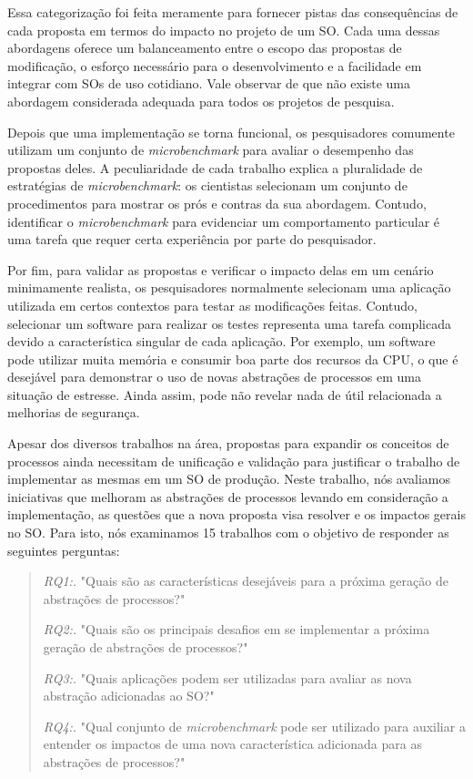 Essa categorização foi feita meramente para fornecer pistas das consequências
de cada proposta em termos do impacto no projeto de um SO. Cada uma dessas
abordagens oferece um balanceamento entre o escopo das propostas de
modificação, o esforço necessário para o desenvolvimento e a facilidade em
integrar com SOs de uso cotidiano. Vale observar de que não existe uma
abordagem considerada adequada para todos os projetos de pesquisa.

Depois que uma implementação se torna funcional, os pesquisadores comumente
utilizam um conjunto de \emph{microbenchmark} para avaliar o desempenho das
propostas deles. A peculiaridade de cada trabalho explica a pluralidade de
estratégias de \emph{microbenchmark}: os cientistas selecionam um conjunto de
procedimentos para mostrar os prós e contras da sua abordagem.  Contudo,
identificar o \emph{microbenchmark} para evidenciar um comportamento particular
é uma tarefa que requer certa experiência por parte do pesquisador.

Por fim, para validar as propostas e verificar o impacto delas em um cenário
minimamente realista, os pesquisadores normalmente selecionam uma aplicação
utilizada em certos contextos para testar as modificações feitas. Contudo,
selecionar um software para realizar os testes representa uma tarefa complicada
devido a característica singular de cada aplicação. Por exemplo, um software
pode utilizar muita memória e consumir boa parte dos recursos da CPU, o que é
desejável para demonstrar o uso de novas abstrações de processos em uma
situação de estresse. Ainda assim, pode não revelar nada de útil relacionada a
melhorias de segurança.

Apesar dos diversos trabalhos na área, propostas para expandir os conceitos de
processos ainda necessitam de unificação e validação para justificar o trabalho
de implementar as mesmas em um SO de produção. Neste trabalho, nós avaliamos
iniciativas que melhoram as abstrações de processos levando em consideração
a implementação, as questões que a nova proposta visa resolver e os impactos
gerais no SO. Para isto, nós examinamos 15 trabalhos com o objetivo de
responder as seguintes perguntas:

\begin{quote}
 \item \textit{RQ1:.} "Quais são as características desejáveis para a próxima geração de abstrações de processos?"
 \item \textit{RQ2:.} "Quais são os principais desafios em se implementar a próxima geração de abstrações de processos?"
 \item \textit{RQ3:.} "Quais aplicações podem ser utilizadas para avaliar as nova abstração adicionadas ao SO?"
 \item \textit{RQ4:.} "Qual conjunto de \emph{microbenchmark} pode ser utilizado para auxiliar a entender os impactos de uma nova característica adicionada para as abstrações de processos?"
\end{quote}

